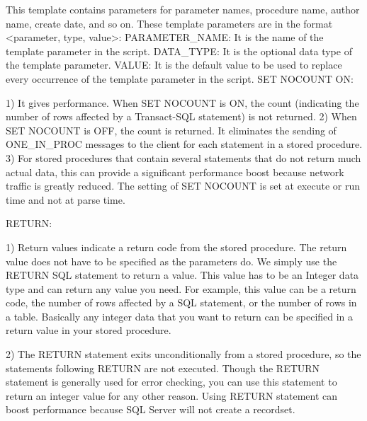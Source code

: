 This template contains parameters for parameter names, procedure name, author name, create date, and so on. These template parameters are in the format <parameter, type, value>:
PARAMETER\_NAME: It is the name of the template parameter in the script.
DATA\_TYPE: It is the optional data type of the template parameter.
VALUE: It is the default value to be used to replace every occurrence of the template parameter in the script.
SET NOCOUNT ON:

1) It gives performance. When SET NOCOUNT is ON, the count (indicating the number of rows affected by a Transact-SQL statement) is not returned. 
2) When SET NOCOUNT is OFF, the count is returned. It eliminates the sending of ONE\_IN\_PROC messages to the client for each statement in a stored procedure. 
3) For stored procedures that contain several statements that do not return much actual data, this can provide a significant performance boost because network traffic is greatly reduced. The setting of SET NOCOUNT is set at execute or run time and not at parse time.
 
RETURN:

1) Return values indicate a return code from the stored procedure. The return value does not have to be specified as the parameters do. We simply use the RETURN SQL statement to return a value. This value has to be an Integer data type and can return any value you need. For example, this value can be a return code, the number of rows affected by a SQL statement, or the number of rows in a table. Basically any integer data that you want to return can be specified in a return value in your stored procedure.

2) The RETURN statement exits unconditionally from a stored procedure, so the statements following RETURN are not executed. Though the RETURN statement is generally used for error checking, you can use this statement to return an integer value for any other reason. Using RETURN statement can boost performance because SQL Server will not create a recordset.

% 


\clearpage